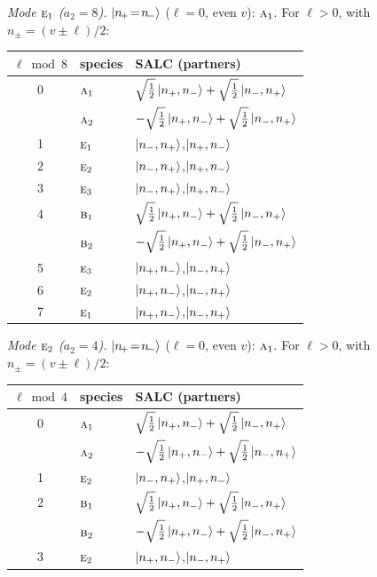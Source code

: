 \documentclass[11pt]{article}
\newcommand{\irr}[1]{\text{\normalfont\scshape #1}}
\begin{document}
\emph{Mode $\irr{e}_{1}$ ($a_2=8$).} $\ket{n_{\!+}\!=\!n_{\!-}}$ ($\ell=0$, even $v$): $\irr{a}_{1}$. For $\ell>0$, with $n_\pm=(v\pm\ell)/2$:
\begin{longtable}{c l l}\hline $\ell\bmod 8$ & species & SALC (partners)\\ \hline\endhead
0 & $\irr{a}_{1}$ & $\sqrt{\tfrac{1}{2}}\ket{n_+,n_-}+\sqrt{\tfrac{1}{2}}\ket{n_-,n_+}$\\
 & $\irr{a}_{2}$ & $-\sqrt{\tfrac{1}{2}}\ket{n_+,n_-}+\sqrt{\tfrac{1}{2}}\ket{n_-,n_+}$\\
1 & $\irr{e}_{1}$ & $\ket{n_-,n_+}$,\quad $\ket{n_+,n_-}$\\
2 & $\irr{e}_{2}$ & $\ket{n_-,n_+}$,\quad $\ket{n_+,n_-}$\\
3 & $\irr{e}_{3}$ & $\ket{n_-,n_+}$,\quad $\ket{n_+,n_-}$\\
4 & $\irr{b}_{1}$ & $\sqrt{\tfrac{1}{2}}\ket{n_+,n_-}+\sqrt{\tfrac{1}{2}}\ket{n_-,n_+}$\\
 & $\irr{b}_{2}$ & $-\sqrt{\tfrac{1}{2}}\ket{n_+,n_-}+\sqrt{\tfrac{1}{2}}\ket{n_-,n_+}$\\
5 & $\irr{e}_{3}$ & $\ket{n_+,n_-}$,\quad $\ket{n_-,n_+}$\\
6 & $\irr{e}_{2}$ & $\ket{n_+,n_-}$,\quad $\ket{n_-,n_+}$\\
7 & $\irr{e}_{1}$ & $\ket{n_+,n_-}$,\quad $\ket{n_-,n_+}$\\
\hline\end{longtable}

\emph{Mode $\irr{e}_{2}$ ($a_2=4$).} $\ket{n_{\!+}\!=\!n_{\!-}}$ ($\ell=0$, even $v$): $\irr{a}_{1}$. For $\ell>0$, with $n_\pm=(v\pm\ell)/2$:
\begin{longtable}{c l l}\hline $\ell\bmod 4$ & species & SALC (partners)\\ \hline\endhead
0 & $\irr{a}_{1}$ & $\sqrt{\tfrac{1}{2}}\ket{n_+,n_-}+\sqrt{\tfrac{1}{2}}\ket{n_-,n_+}$\\
 & $\irr{a}_{2}$ & $-\sqrt{\tfrac{1}{2}}\ket{n_+,n_-}+\sqrt{\tfrac{1}{2}}\ket{n_-,n_+}$\\
1 & $\irr{e}_{2}$ & $\ket{n_-,n_+}$,\quad $\ket{n_+,n_-}$\\
2 & $\irr{b}_{1}$ & $\sqrt{\tfrac{1}{2}}\ket{n_+,n_-}+\sqrt{\tfrac{1}{2}}\ket{n_-,n_+}$\\
 & $\irr{b}_{2}$ & $-\sqrt{\tfrac{1}{2}}\ket{n_+,n_-}+\sqrt{\tfrac{1}{2}}\ket{n_-,n_+}$\\
3 & $\irr{e}_{2}$ & $\ket{n_+,n_-}$,\quad $\ket{n_-,n_+}$\\
\hline\end{longtable}
\end{document}
